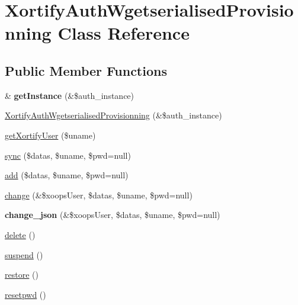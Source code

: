 \hypertarget{class_xortify_auth_wgetserialised_provisionning}{\section{Xortify\-Auth\-Wgetserialised\-Provisionning Class Reference}
\label{class_xortify_auth_wgetserialised_provisionning}
}
\subsection*{Public Member Functions}
\begin{DoxyCompactItemize}
\item 
\hypertarget{class_xortify_auth_wgetserialised_provisionning_a47b0f3c4c8f82a13b32160e19107e13c}{\& {\bfseries get\-Instance} (\&\$auth\-\_\-instance)}\label{class_xortify_auth_wgetserialised_provisionning_a47b0f3c4c8f82a13b32160e19107e13c}

\item 
\hyperlink{class_xortify_auth_wgetserialised_provisionning_ad417ed7ad559216f3b264fb0bc8baeab}{Xortify\-Auth\-Wgetserialised\-Provisionning} (\&\$auth\-\_\-instance)
\item 
\hyperlink{class_xortify_auth_wgetserialised_provisionning_acb298b3ba61de82269f2d6a0da7d8a64}{get\-Xortify\-User} (\$uname)
\item 
\hyperlink{class_xortify_auth_wgetserialised_provisionning_a3db42691dc8e2151b9819c8663d1ebc3}{sync} (\$datas, \$uname, \$pwd=null)
\item 
\hyperlink{class_xortify_auth_wgetserialised_provisionning_a92ea9ac6daf4ade65eccbd0ad2721c44}{add} (\$datas, \$uname, \$pwd=null)
\item 
\hyperlink{class_xortify_auth_wgetserialised_provisionning_a2d481b2b51051f5ae99f5ff39f582dcc}{change} (\&\$xoops\-User, \$datas, \$uname, \$pwd=null)
\item 
\hypertarget{class_xortify_auth_wgetserialised_provisionning_ad98ac91d4289fa011448cdba28bc6bfc}{{\bfseries change\-\_\-json} (\&\$xoops\-User, \$datas, \$uname, \$pwd=null)}\label{class_xortify_auth_wgetserialised_provisionning_ad98ac91d4289fa011448cdba28bc6bfc}

\item 
\hyperlink{class_xortify_auth_wgetserialised_provisionning_a848e2c6e847f0eb61b9f673f38298d16}{delete} ()
\item 
\hyperlink{class_xortify_auth_wgetserialised_provisionning_a077f94fa57f504a674626ec31a42d069}{suspend} ()
\item 
\hyperlink{class_xortify_auth_wgetserialised_provisionning_a57d871a23337fd1093d2e5cfc9aa2b92}{restore} ()
\item 
\hyperlink{class_xortify_auth_wgetserialised_provisionning_ab58f995aca418dc79018a2e43a0396c4}{resetpwd} ()
\end{DoxyCompactItemize}
